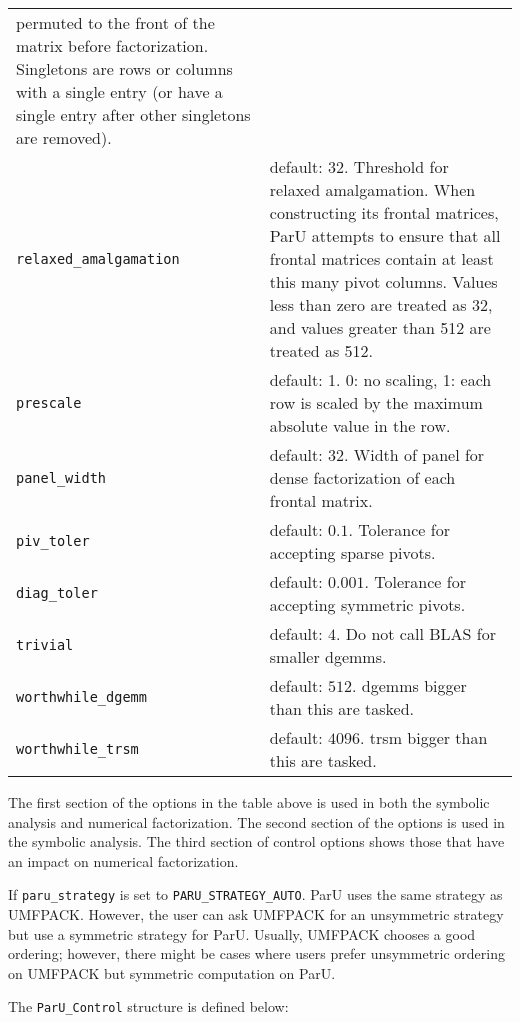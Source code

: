\documentclass[12pt]{article}
\begin{document}
{\begin{tabular}{|lp{4in}|}
        permuted to the front of the matrix before factorization.  Singletons
        are rows or columns with a single entry (or have a single entry after
        other singletons are removed). \\
    \verb'relaxed_amalgamation' & default: 32. Threshold for relaxed
        amalgamation. When constructing its frontal matrices, ParU attempts to
        ensure that all frontal matrices contain at least this many pivot
        columns.  Values less than zero are treated as 32, and values greater
        than 512 are treated as 512. \\
    \hline
    \verb'prescale' & default: 1. 0: no scaling,
        1: each row is scaled by the maximum
        absolute value in the row. \\
    \verb'panel_width' & default: 32. Width of panel for dense factorization of
        each frontal matrix. \\
    \verb'piv_toler' & default: $0.1$. Tolerance for accepting sparse pivots. \\
    \verb'diag_toler' & default: $0.001$. Tolerance for accepting symmetric
        pivots. \\
    \verb'trivial' & default: $4$. Do not call BLAS for smaller dgemms. \\
    \verb'worthwhile_dgemm' & default: $512$. dgemms bigger than this are
        tasked. \\
    \verb'worthwhile_trsm' & default: $4096$. trsm bigger than this are
        tasked.  \\
    \hline
    \end{tabular}
    }
    \vspace{0.1in}

    The first section of the options in the table above is used in both the
    symbolic analysis and numerical factorization.  The second section of the
    options is used in the symbolic analysis.  The third section of control
    options shows those that have an impact on numerical factorization.

    If \verb'paru_strategy' is set to \verb'PARU_STRATEGY_AUTO'.  ParU uses the
    same strategy as UMFPACK. However, the user can ask UMFPACK for an
    unsymmetric strategy but use a symmetric strategy for ParU. Usually,
    UMFPACK chooses a good ordering; however, there might be cases where users
    prefer unsymmetric ordering on UMFPACK but symmetric computation on ParU.

    The \verb'ParU_Control' structure is defined below:
\end{document}
